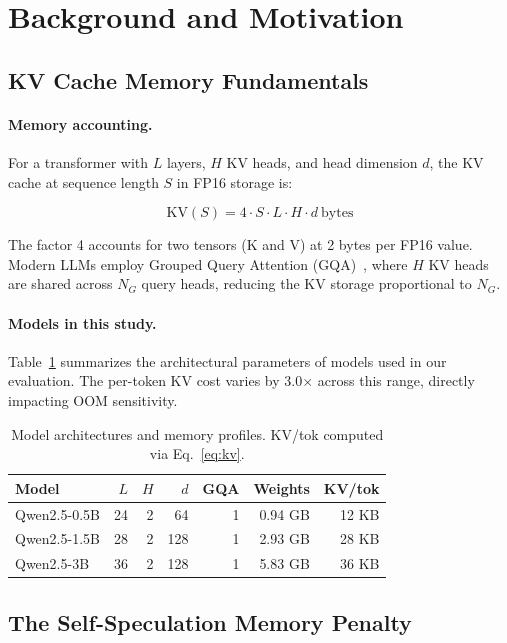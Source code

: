\documentclass[review]{elsarticle}
\theoremstyle{definition}
\theoremstyle{remark}
\begin{document}
\section{Background and Motivation}

\subsection{KV Cache Memory Fundamentals}

\paragraph{Memory accounting.}
For a transformer with $L$ layers, $H$ KV heads, and head dimension $d$,
the KV cache at sequence length $S$ in FP16 storage is:

\[
\text{KV}(S) = 4 \cdot S \cdot L \cdot H \cdot d \ \text{bytes}
\label{eq:kv}
\]

The factor 4 accounts for two tensors (K and V) at 2 bytes per FP16 value.
Modern LLMs employ Grouped Query Attention (GQA)~\cite{gqa}, where $H$
KV heads are shared across $N_G$ query heads, reducing the KV storage
proportional to $N_G$.

\paragraph{Models in this study.}
Table~\ref{tab:arch} summarizes the architectural parameters of models
used in our evaluation. The per-token KV cost varies by 3.0$\times$
across this range, directly impacting OOM sensitivity.

\begin{table}[t]
\centering
\caption{Model architectures and memory profiles. KV/tok computed via
Eq.~\ref{eq:kv}.}
\label{tab:arch}
\begin{tabular}{lrrrrrr}
\toprule
Model & $L$ & $H$ & $d$ & GQA & Weights & KV/tok \\
\midrule
Qwen2.5-0.5B & 24 & 2 & 64 & 1 & 0.94 GB & 12 KB \\
Qwen2.5-1.5B & 28 & 2 & 128 & 1 & 2.93 GB & 28 KB \\
Qwen2.5-3B   & 36 & 2 & 128 & 1 & 5.83 GB & 36 KB \\
\bottomrule
\end{tabular}
\end{table}

\subsection{The Self-Speculation Memory Penalty}
\end{document}
